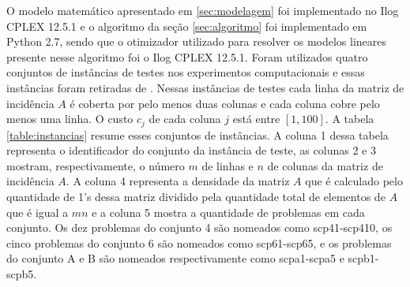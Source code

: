 O modelo matemático apresentado em \ref{sec:modelagem} foi implementado
no Ilog CPLEX 12.5.1 e o algoritmo da seção \ref{sec:algoritmo} foi implementado
em Python 2.7, sendo que o otimizador utilizado para resolver os modelos lineares presente nesse algoritmo foi o Ilog CPLEX 12.5.1.
Foram utilizados quatro conjuntos de instâncias de testes nos experimentos computacionais e essas instâncias foram retiradas de \cite{cormen3ndFaster}.
Nessas instâncias de testes cada linha da matriz de incidência $A$ é coberta por pelo menos duas colunas e cada coluna cobre pelo menos uma linha. O
custo $c_j$ de cada coluna $j$ está entre $[1,100]$. A tabela \ref{table:instancias} resume esses conjuntos de instâncias. A coluna 1 dessa tabela 
representa o identificador do conjunto da instância de teste,
as colunas 2 e 3 mostram, respectivamente, o número $m$ de linhas e $n$ de colunas da matriz de incidência $A$. A coluna 4 representa
a densidade da matriz $A$ que é calculado pelo quantidade de 1's dessa matriz dividido pela quantidade total de elementos de $A$ que é igual a 
$mn$ e a coluna 5 mostra a quantidade de problemas em cada conjunto. Os dez problemas do conjunto 4 são nomeados como scp41-scp410, os cinco
problemas do conjunto 6 são nomeados como scp61-scp65, e os problemas do conjunto A e B são nomeados respectivamente como scpa1-scpa5
e scpb1-scpb5.

